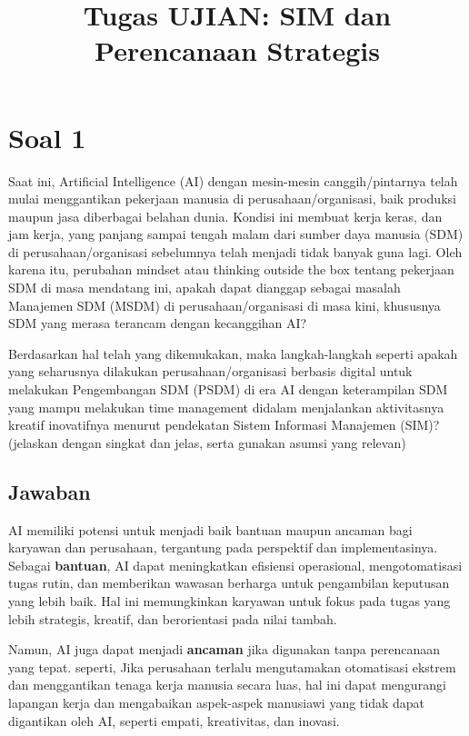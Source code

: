 \documentclass{article}
\title{Tugas UJIAN: SIM dan Perencanaan Strategis }
\begin{document}
\maketitle

\section*{Soal 1}
Saat ini, Artificial Intelligence (AI) dengan mesin-mesin canggih/pintarnya telah mulai menggantikan pekerjaan manusia di perusahaan/organisasi, baik produksi maupun jasa diberbagai belahan dunia. Kondisi ini membuat kerja keras, dan jam kerja, yang panjang sampai tengah malam dari sumber daya manusia (SDM) di perusahaan/organisasi sebelumnya telah menjadi tidak banyak guna lagi. Oleh karena itu, perubahan mindset atau thinking outside the box tentang pekerjaan SDM di masa mendatang ini, apakah dapat dianggap sebagai masalah Manajemen SDM (MSDM) di perusahaan/organisasi di masa kini, khususnya SDM yang merasa terancam dengan kecanggihan AI?

Berdasarkan hal telah yang dikemukakan, maka langkah-langkah seperti apakah yang seharusnya dilakukan perusahaan/organisasi berbasis digital untuk melakukan Pengembangan SDM (PSDM) di era AI dengan keterampilan SDM yang mampu melakukan time
management didalam menjalankan aktivitasnya kreatif inovatifnya menurut pendekatan Sistem Informasi Manajemen (SIM)? (jelaskan dengan singkat dan jelas, serta gunakan asumsi yang relevan)
\subsection*{Jawaban}
AI memiliki potensi untuk menjadi baik bantuan maupun ancaman bagi karyawan dan perusahaan, tergantung pada perspektif dan implementasinya. Sebagai \textbf{bantuan}, AI dapat meningkatkan efisiensi operasional, mengotomatisasi tugas rutin, dan memberikan wawasan berharga untuk pengambilan keputusan yang lebih baik. Hal ini memungkinkan karyawan untuk fokus pada tugas yang lebih strategis, kreatif, dan berorientasi pada nilai tambah.

Namun, AI juga dapat menjadi \textbf{ancaman} jika digunakan tanpa perencanaan yang tepat. seperti, Jika perusahaan terlalu mengutamakan otomatisasi ekstrem dan menggantikan tenaga kerja manusia secara luas, hal ini dapat mengurangi lapangan kerja dan mengabaikan aspek-aspek manusiawi yang tidak dapat digantikan oleh AI, seperti empati, kreativitas, dan inovasi.
\end{document}
